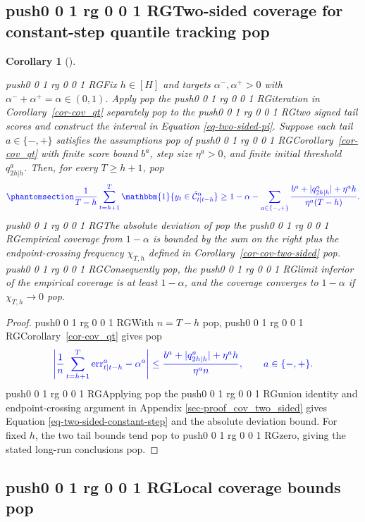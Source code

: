 \documentclass[
  american,
  12pt]{article}
\theoremstyle{plain}
\theoremstyle{plain}
\newtheorem{corollary}{Corollary}[section]
\theoremstyle{remark}
\newcommand{\CPTSadd}[1]{\ifmmode\else\leavevmode\fi\pdfcolorstack 0 push{0 0 1 rg 0 0 1 RG}#1\pdfcolorstack 0 pop}
\begin{document}
\subsection{\CPTSadd{Two-sided coverage for constant-step quantile
tracking}}\label{sec-two-sided-constant-step}

\begin{corollary}[]\protect\hypertarget{cor-cov-two-sided-qt}{}\label{cor-cov-two-sided-qt}

\CPTSadd{Fix \(h\in[H]\) and targets \(\alpha^{-},\alpha^{+}>0\) with
\(\alpha^{-}+\alpha^{+}=\alpha\in(0,1)\). Apply} the \CPTSadd{iteration in
Corollary~\ref{cor-cov_qt} separately} to the \CPTSadd{two signed tail scores and
construct the interval in Equation \eqref{eq-two-sided-pi}. Suppose each
tail \(a\in\{-,+\}\) satisfies the assumptions} of
\CPTSadd{Corollary~\ref{cor-cov_qt} with finite score bound \(b^a\), step size
\(\eta^a>0\), and finite initial threshold \(q^a_{2h|h}\). Then, for
every \(T\geq h+1\),}
\begin{equation}\CPTSadd{\phantomsection\label{eq-two-sided-constant-step}{
\frac{1}{T-h}\sum_{t=h+1}^{T}\mathbbm{1}\{y_t\in\hat{\mathcal C}_{t|t-h}^{\alpha}\}
\geq 1-\alpha-\sum_{a\in\{-,+\}}\frac{b^a+|q^a_{2h|h}|+\eta^a h}{\eta^a(T-h)}.
}}\end{equation} \CPTSadd{The absolute deviation of} the \CPTSadd{empirical coverage from
\(1-\alpha\) is bounded by the sum on the right plus the
endpoint-crossing frequency \(\chi_{T,h}\) defined in
Corollary~\ref{cor-cov-two-sided}}. \CPTSadd{Consequently}, the \CPTSadd{limit inferior of
the empirical coverage is at least \(1-\alpha\), and the coverage
converges to \(1-\alpha\) if \(\chi_{T,h}\to0\)}.

\end{corollary}

\begin{proof}
\CPTSadd{With \(n=T-h\)}, \CPTSadd{Corollary~\ref{cor-cov_qt} gives} \[
\CPTSadd{\left|\frac1n\sum_{t=h+1}^{T}\mathrm{err}_{t|t-h}^{a}-\alpha^a\right|
\leq\frac{b^a+|q^a_{2h|h}|+\eta^a h}{\eta^a n},\qquad a\in\{-,+\}.}
\] \CPTSadd{Applying} the \CPTSadd{union identity and endpoint-crossing argument in
Appendix \ref{sec-proof_cov_two_sided} gives Equation
\eqref{eq-two-sided-constant-step} and the absolute deviation bound. For
fixed \(h\), the two tail bounds tend} to \CPTSadd{zero, giving the stated
long-run conclusions}.
\end{proof}

\subsection{\CPTSadd{Local coverage bounds}}\label{sec-local-coverage}
\end{document}
